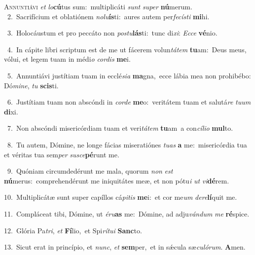 \lettrine{\initial\textcolor{\initialcolor}{A}}{nnuntiávi} \textit{et} \textit{lo}\-\textbf{cú}tus sum:~\star multiplicáti \textit{sunt} \textit{su}\-\textit{per} \textbf{nú}\-merum.\\
{\numbfont\textcolor{\numbcolor}{~2.}}~Sacrifícium et oblatiónem \textit{no}\-\textit{lu}\textbf{ís}ti:~\star aures autem per\-\textit{fe}\-\textit{cís}\textit{ti} \textbf{mi}\-hi.\par
{\numbfont\textcolor{\numbcolor}{~3.}}~Holocáustum et pro peccáto non \textit{pos}\-\textit{tu}\textbf{lás}ti:~\star tunc di\-\textit{xi}\-: \textit{Ec}\-\textit{ce} \textbf{vé}\-nio.\par
{\numbfont\textcolor{\numbcolor}{~4.}}~In cápite libri scriptum est de me ut fácerem volun\-\textit{tá}\-\textit{tem} \textbf{tu}\-am:~\star Deus meus, vólui, et legem tuam in médi\textit{o} \textit{cor}\-\textit{dis} \textbf{me}\-i.\par
{\numbfont\textcolor{\numbcolor}{~5.}}~Annuntiávi justítiam tuam in ecclé\-\textit{si}\-\textit{a} \textbf{ma}\-gna,~\star ecce lábia mea non prohibébo: Dó\-\textit{mi}\-\textit{ne}, \textit{tu} \textbf{scis}\-ti.\par
{\numbfont\textcolor{\numbcolor}{~6.}}~Justítiam tuam non abscóndi in \textit{cor}\-\textit{de} \textbf{me}\-o:~\star veritátem tuam et salutá\textit{re} \textit{tu}\-\textit{um} \textbf{di}\-xi.\par
{\numbfont\textcolor{\numbcolor}{~7.}}~Non abscóndi misericórdiam tuam et veri\-\textit{tá}\-\textit{tem} \textbf{tu}\-am~\star a con\-\textit{cí}\-\textit{li}\textit{o} \textbf{mul}\-to.\par
{\numbfont\textcolor{\numbcolor}{~8.}}~Tu autem, Dómine, ne longe fácias miseratiónes \textit{tu}\-\textit{as} \textbf{a} me:~\star misericórdia tua et véritas tua sem\textit{per} \textit{su}\-\textit{sce}\textbf{pé}runt me.\par
{\numbfont\textcolor{\numbcolor}{~9.}}~Quóniam circumdedérunt me mala, quorum \textit{non} \textit{est} \textbf{nú}\-merus:~\star comprehendérunt me iniquitátes meæ, et non pótu\textit{i} \textit{ut} \textit{vi}\-\textbf{dé}rem.\par
{\numbfont\textcolor{\numbcolor}{10.}}~Multiplicátæ sunt super capíllos cá\-\textit{pi}\-\textit{tis} \textbf{me}\-i:~\star et cor me\textit{um} \textit{de}\-\textit{re}\textbf{lí}quit me.\par
{\numbfont\textcolor{\numbcolor}{11.}}~Compláceat tibi, Dómine, ut \textit{é}\-\textit{ru}\textbf{as} me:~\star Dómine, ad adju\-\textit{ván}\-\textit{dum} \textit{me} \textbf{ré}\-spice.\par
{\numbfont\textcolor{\numbcolor}{12.}}~Glória Pa\-\textit{tri}\-, \textit{et} \textbf{Fí}\-lio,~\star et Spi\-\textit{rí}\-\textit{tu}\textit{i} \textbf{Sanc}\-to.\par
{\numbfont\textcolor{\numbcolor}{13.}}~Sicut erat in princípio, et \textit{nunc}\-, \textit{et} \textbf{sem}\-per,~\star et in sǽcula sæ\-\textit{cu}\-\textit{ló}\textit{rum}. \textbf{A}\-men.\par

